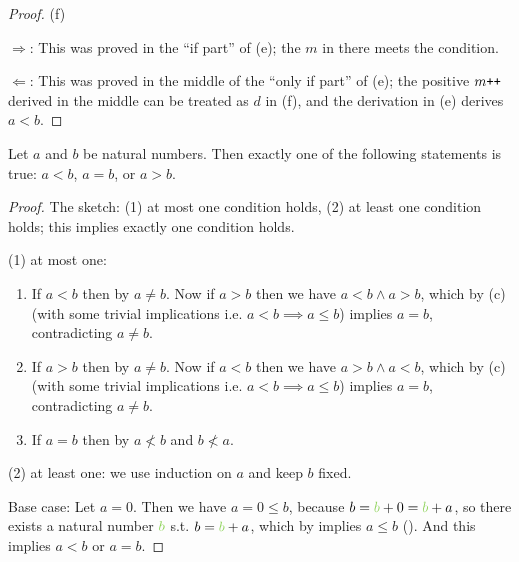 \begin{proof}{(f)}

\( \Longrightarrow \): This was proved in the ``if part'' of (e); the \(m\) in there meets the condition.

\( \Longleftarrow \): This was proved in the middle of the ``only if part'' of (e); the positive \(m\texttt{++}\) derived in the middle can be treated as \(d\) in (f), and the derivation in (e) derives \(a < b\).
\end{proof}

\begin{proposition} \label{prop 2.2.13}
Let \(a\) and \(b\) be natural numbers. Then exactly one of the following statements is true: \(a < b\), \(a = b\), or \(a > b\).
\end{proposition}
\begin{proof}
The sketch: (1) at most one condition holds, (2) at least one condition holds; this implies exactly one condition holds.

(1) at most one:
    \begin{enumerate}
        \item If \(a < b\) then by  \(a \neq b\). Now if \(a > b\) then we have \(a < b \land a > b\), which by (c) (with some trivial implications i.e. \(a < b \implies a \leq b\)) implies \(a = b\), contradicting \(a \neq b\).
        \item If \(a > b\) then by  \(a \neq b\). Now if \(a < b\) then we have \(a > b \land a < b\), which by (c) (with some trivial implications i.e. \(a < b \implies a \leq b\)) implies \(a = b\), contradicting \(a \neq b\).
        \item If \(a = b\) then by  \(a \not < b \) and \(b \not < a\).
    \end{enumerate}

(2) at least one: we use induction on \(a\) and keep \(b\) fixed.

Base case: Let \(a = 0\). Then we have \(a = 0 \leq b\), because \(b = \GREEN{b} + 0 = \GREEN{b} + a\), so there exists a natural number \(\GREEN{b}\) s.t. \(b = \GREEN{b} + a\), which by  implies \(a \leq b\) (). And this implies \(a < b\) or \(a = b\).


\end{proof}
